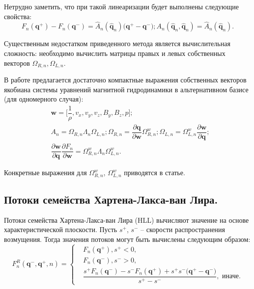 \documentclass[14pt, a4paper, fleqn]{extreport}
\begin{document}
	Нетрудно заметить, что при такой линеаризации будет выполнены следующие свойства:
	\begin{equation*}
		F_n(\textbf{q}^{+}) - F_n(\textbf{q}^{-}) 
			= \hat{A}_n(\hat{\textbf{q}}_n)\Big( \textbf{q}^{+}-\textbf{q}^{-} \Big);
		A_n(\hat{\textbf{q}}_n,\hat{\textbf{q}}_n) = \hat{A}_n(\hat{\textbf{q}}_n).
	\end{equation*}

	Существенным недостатком приведенного метода является вычислительная сложность:
	необходимо вычислить матрицы правых и левых собственных векторов $\Omega_{R,n}, \Omega_{L,n}$.
	
	В работе \cite{ZACHARY1992341}
	предлагается достаточно компактные выражения собственных векторов
	якобиана системы уравнений магнитной гидродинамики
	в альтернативном базисе (для одномерного случая):
	\begin{equation*}
	\begin{split}
		&\textbf{w} = \Big[ \dfrac{1}{\rho}, v_x, v_y, v_z, B_y, B_z, p \Big]; \\
		&A_n 
			= \Omega_{R,n}\Lambda_{n}\Omega_{L,n}; 
			  \Omega_{R,n} = \dfrac{\partial\textbf{q}}{\partial\textbf{w}} \Omega_{R,n}^w;
			  \Omega_{L,n} = \Omega_{L,n}^w \dfrac{\partial\textbf{w}}{\partial\textbf{q}}; \\
		&\dfrac{\partial\textbf{w}}{\partial\textbf{q}} \dfrac{\partial F_n}{\partial \textbf{w}}
			= \Omega_{R,n}^w\Lambda_{n}\Omega_{L,n}^w.
	\end{split}
	\end{equation*}
	
	Конкретные выражения для $\Omega_{R,n}^w$, $\Omega_{L,n}^w$ приводятся в статье.
	
	\subsection{Потоки семейства Хартена-Лакса-ван Лира.}
	
	Потоки семейства Хартена-Лакса-ван Лира (HLL)
	вычисляют значение на основе характеристической плоскости.
	Пусть $s^{+}$, $s^{-}$ -- скорости распространения возмущения.
	Тогда значения потоков могут быть вычислены следующим образом:
	\begin{equation*}
		F_{n}^R(\textbf{q}^{-},\textbf{q}^{+},n) = 
		\begin{cases}
			&F_n(\textbf{q}^{+}), s^{+} < 0, \\
			&F_n(\textbf{q}^{-}), s^{-} > 0, \\
			&\dfrac{ s^{+}F_n(\textbf{q}^{-}) -
				     s^{-}F_n(\textbf{q}^{+}) + 
			         s^{+}s^{-}\big( \textbf{q}^{+} - \textbf{q}^{-} \big)}{ s^{+}-s^{-} }, \text{ иначе}.
		\end{cases}
	\end{equation*}
	
\end{document}
